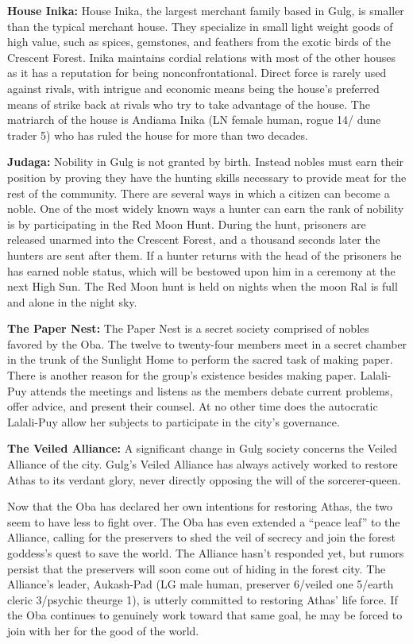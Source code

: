 {
	\textbf{House Inika:} House Inika, the largest merchant family based in Gulg, is smaller than the typical merchant house. They specialize in small light weight goods of high value, such as spices, gemstones, and feathers from the exotic birds of the Crescent Forest. Inika maintains cordial relations with most of the other houses as it has a reputation for being nonconfrontational. Direct force is rarely used against rivals, with intrigue and economic means being the house's preferred means of strike back at rivals who try to take advantage of the house. The matriarch of the house is Andiama Inika (LN female human, rogue 14/ dune trader 5) who has ruled the house for more than two decades.

	\textbf{Judaga:} Nobility in Gulg is not granted by birth. Instead nobles must earn their position by proving they have the hunting skills necessary to provide meat for the rest of the community. There are several ways in which a citizen can become a noble. One of the most widely known ways a hunter can earn the rank of nobility is by participating in the Red Moon Hunt. During the hunt, prisoners are released unarmed into the Crescent Forest, and a thousand seconds later the hunters are sent after them. If a hunter returns with the head of the prisoners he has earned noble status, which will be bestowed upon him in a ceremony at the next High Sun. The Red Moon hunt is held on nights when the moon Ral is full and alone in the night sky.

	\textbf{The Paper Nest:} The Paper Nest is a secret society comprised of nobles favored by the Oba. The twelve to twenty-four members meet in a secret chamber in the trunk of the Sunlight Home to perform the sacred task of making paper. There is another reason for the group's existence besides making paper. Lalali-Puy attends the meetings and listens as the members debate current problems, offer advice, and present their counsel. At no other time does the autocratic Lalali-Puy allow her subjects to participate in the city's governance.

	\textbf{The Veiled Alliance:} A significant change in Gulg society concerns the Veiled Alliance of the city. Gulg's Veiled Alliance has always actively worked to restore Athas to its verdant glory, never directly opposing the will of the sorcerer-queen.

	Now that the Oba has declared her own intentions for restoring Athas, the two seem to have less to fight over. The Oba has even extended a ``peace leaf'' to the Alliance, calling for the preservers to shed the veil of secrecy and join the forest goddess's quest to save the world. The Alliance hasn't responded yet, but rumors persist that the preservers will soon come out of hiding in the forest city. The Alliance's leader, Aukash-Pad (LG male human, preserver 6/veiled one 5/earth cleric 3/psychic theurge 1), is utterly committed to restoring Athas' life force. If the Oba continues to genuinely work toward that same goal, he may be forced to join with her for the good of the world.
}
